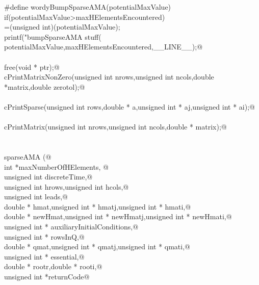 \documentclass[12pt]{article}
\begin{document}
\begin{flushleft}
\begin{minipage}{\linewidth}
\begin{list}{}{}
\mbox{}\verb@#define wordyBumpSparseAMA(potentialMaxValue) \@\\
\mbox{}\verb@        if(potentialMaxValue>maxHElementsEncountered) \@\\
\mbox{}\verb@maxHElementsEncountered=(unsigned int)(potentialMaxValue);\@\\
\mbox{}\verb@        printf("bumpSparseAMA stuff(%d,%d) at line %d\n",\@\\
\mbox{}\verb@        potentialMaxValue,maxHElementsEncountered,__LINE__);@\\
\mbox{}\verb@@\\
\mbox{}\verb@void free(void * ptr);@\\
\mbox{}\verb@void cPrintMatrixNonZero(unsigned int nrows,unsigned int ncols,double *matrix,double zerotol);@\\
\mbox{}\verb@@\\
\mbox{}\verb@void cPrintSparse(unsigned int rows,double * a,unsigned int * aj,unsigned int * ai);@\\
\mbox{}\verb@@\\
\mbox{}\verb@void cPrintMatrix(unsigned int nrows,unsigned int ncols,double * matrix);@\\
\mbox{}\verb@@\\
\mbox{}\verb@@\\
\mbox{}\verb@void sparseAMA (@\\
\mbox{}\verb@unsigned int *maxNumberOfHElements,             @\\
\mbox{}\verb@    unsigned int discreteTime,@\\
\mbox{}\verb@    unsigned int hrows,unsigned int hcols,@\\
\mbox{}\verb@    unsigned int leads,@\\
\mbox{}\verb@    double * hmat,unsigned int * hmatj,unsigned int * hmati,@\\
\mbox{}\verb@    double * newHmat,unsigned int * newHmatj,unsigned int * newHmati,@\\
\mbox{}\verb@    unsigned int *  auxiliaryInitialConditions,@\\
\mbox{}\verb@    unsigned int *  rowsInQ,@\\
\mbox{}\verb@    double * qmat,unsigned int * qmatj,unsigned int * qmati,@\\
\mbox{}\verb@    unsigned int * essential,@\\
\mbox{}\verb@    double * rootr,double * rooti,@\\
\mbox{}\verb@    unsigned int *returnCode@\\

\end{list}
\end{minipage}
\end{flushleft}
\end{document}
